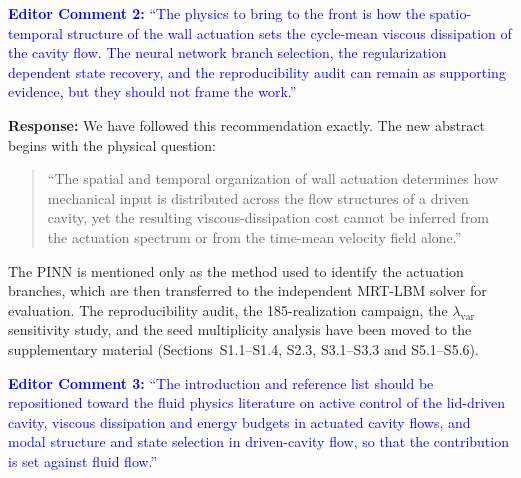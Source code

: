 \documentclass[11pt,a4paper]{article}
\begin{document}
\vspace{1em}

\noindent\textcolor{blue}{\textbf{Editor Comment 2:} ``The physics to bring to
the front is how the spatio-temporal structure of the wall actuation sets the
cycle-mean viscous dissipation of the cavity flow. The neural network branch
selection, the regularization dependent state recovery, and the reproducibility
audit can remain as supporting evidence, but they should not frame the work.''}

\vspace{0.5em}

\noindent\textbf{Response:} We have followed this recommendation exactly. The
new abstract begins with the physical question:

\begin{quote}
``The spatial and temporal organization of wall actuation determines how
mechanical input is distributed across the flow structures of a driven cavity,
yet the resulting viscous-dissipation cost cannot be inferred from the actuation
spectrum or from the time-mean velocity field alone.''
\end{quote}

The PINN is mentioned only as the method used to identify the actuation
branches, which are then transferred to the independent MRT-LBM solver for
evaluation. The reproducibility audit, the 185-realization campaign, the
$\lambda_{\mathrm{var}}$ sensitivity study, and the seed multiplicity analysis
have been moved to the supplementary material (Sections~S1.1--S1.4, S2.3,
S3.1--S3.3 and S5.1--S5.6).

\vspace{1em}

\noindent\textcolor{blue}{\textbf{Editor Comment 3:} ``The introduction and
reference list should be repositioned toward the fluid physics literature on
active control of the lid-driven cavity, viscous dissipation and energy budgets
in actuated cavity flows, and modal structure and state selection in driven-cavity
flow, so that the contribution is set against fluid flow.''}

\vspace{0.5em}
\end{document}
